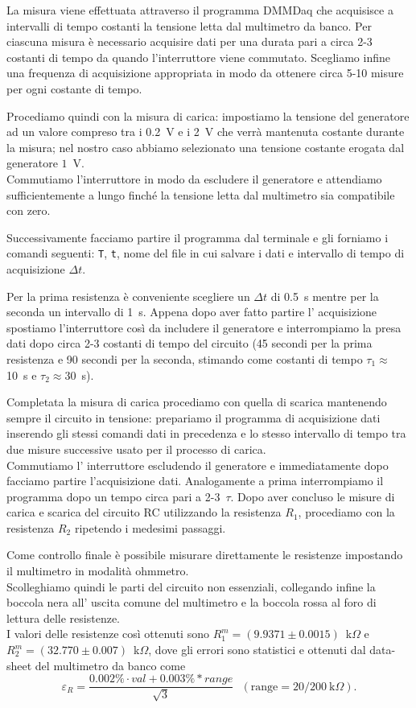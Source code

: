 \documentclass[
    reprint, 
    superscriptaddress, 
    altaffilletter, 
    amsmath, 
    amssymb, 
    a4paper
]{revtex4-2}
\newcommand{\mstdErr}[1]{\varepsilon_{#1}}
\begin{document}
    La misura viene effettuata attraverso il programma DMMDaq che acquisisce a intervalli di tempo costanti la tensione letta dal multimetro da banco. Per ciascuna misura è necessario acquisire dati per una durata pari a circa 2-3 costanti di tempo da quando l’interruttore viene commutato.  Scegliamo infine una frequenza di acquisizione appropriata in modo da ottenere circa 5-10 misure per ogni costante di tempo. 

    Procediamo quindi con la misura di carica: impostiamo la tensione del generatore ad un valore compreso tra i 0.2~V e i 2~V che verrà mantenuta costante durante la misura; nel nostro caso abbiamo selezionato una tensione costante erogata dal generatore $1$~V.\\
    Commutiamo l’interruttore in modo da escludere il generatore e attendiamo sufficientemente a lungo finché la tensione letta dal multimetro  sia compatibile con zero. 

    Successivamente facciamo partire il programma dal terminale e gli forniamo i comandi seguenti: \verb|T|, \verb|t|, nome del file in cui salvare i dati e intervallo di tempo di acquisizione $\Delta t$. 

    Per la prima resistenza è conveniente scegliere un $\Delta t$ di 0.5~s mentre per la seconda un intervallo di 1~s. Appena dopo aver fatto partire l’ acquisizione spostiamo l'interruttore così da includere il generatore e interrompiamo la presa dati dopo circa 2-3 costanti di tempo del circuito (45 secondi per la prima resistenza e 90 secondi per la seconda, stimando come costanti di tempo $\tau_1\approx$10~s e $\tau_2\approx$30~s).

    Completata la misura di carica procediamo con quella di scarica mantenendo sempre il circuito in tensione:  prepariamo il programma di acquisizione dati inserendo gli stessi comandi dati in precedenza e lo stesso intervallo di tempo tra due misure successive usato per il processo di carica. \\
    Commutiamo l’ interruttore escludendo il generatore e immediatamente dopo facciamo partire  l’acquisizione dati. Analogamente a prima interrompiamo il programma dopo un tempo circa pari a 2-3~$\tau$.
    Dopo aver concluso le misure di carica e scarica del circuito RC utilizzando la resistenza $R_1$, procediamo con la resistenza $R_2$ ripetendo i medesimi passaggi.

    Come controllo finale è possibile misurare direttamente le resistenze impostando il multimetro in modalità ohmmetro. \\
    Scolleghiamo quindi le parti del circuito non essenziali, collegando infine la boccola nera all’ uscita comune del multimetro e la boccola rossa al foro di lettura delle resistenze. \\
    I valori delle resistenze così ottenuti sono $R_1^m=(9.9371\pm0.0015)$~k$\Omega$ e $R_2^m=(32.770\pm0.007)$~k$\Omega$, dove gli errori sono statistici e ottenuti dal data-sheet del multimetro da banco come
    \[\mstdErr{R}=\frac{0.002\% \cdot val + 0.003\% * range}{\sqrt{3}}~~~(\text{range}=20/200~\text{k}\Omega).\]
\end{document}
